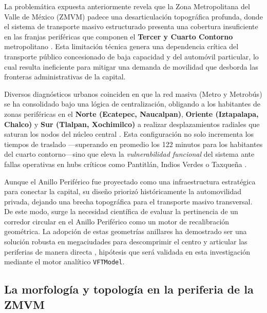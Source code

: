 La problemática expuesta anteriormente revela que la Zona Metropolitana del Valle de México (ZMVM) padece una desarticulación 
topográfica profunda, donde el sistema de transporte masivo estructurado presenta una cobertura insuficiente en las franjas 
periféricas que componen el \textbf{Tercer y Cuarto Contorno} metropolitano \parencite{semovi2020diagnostico}. Esta limitación
técnica genera una dependencia crítica del transporte público concesionado de baja capacidad y del automóvil particular, 
lo cual resulta ineficiente para mitigar una demanda de movilidad que desborda las fronteras administrativas de la capital.

Diversos diagnósticos urbanos coinciden en que la red masiva (Metro y Metrobús) se ha consolidado bajo una lógica de centralización,
obligando a los habitantes de zonas periféricas en el \textbf{Norte (Ecatepec, Naucalpan)}, \textbf{Oriente (Iztapalapa, Chalco)} y 
\textbf{Sur (Tlalpan, Xochimilco)} a realizar desplazamientos radiales que saturan los nodos del núcleo central \parencite{obras2025}. 
Esta configuración no solo incrementa los tiempos de traslado —superando en promedio los 122 minutos para los habitantes del 
cuarto contorno—\DIFaddbegin \DIFadd{, }\DIFaddend sino que eleva la \textit{vulnerabilidad funcional} del sistema ante fallas operativas en hubs críticos como Pantitlán,
Indios Verdes o Taxqueña \parencite{loterovélez2014}.

Aunque el Anillo Periférico fue proyectado como una infraestructura estratégica para conectar la capital, su diseño priorizó históricamente
la automovilidad privada, dejando una brecha topográfica para el transporte masivo transversal. De este modo, surge la necesidad científica 
de evaluar la pertinencia de un corredor circular en el Anillo Periférico como un motor de recalibración geométrica. La adopción de estas 
geometrías anillares ha demostrado ser una solución robusta en megaciudades para descomprimir el centro y articular las periferias de manera
directa \parencite{efe2023}, hipótesis que será validada en esta investigación mediante el motor analítico \texttt{VFTModel}.

\subsection{La morfología y topología en la periferia de la ZMVM}
\label{subsec:morfologia}


